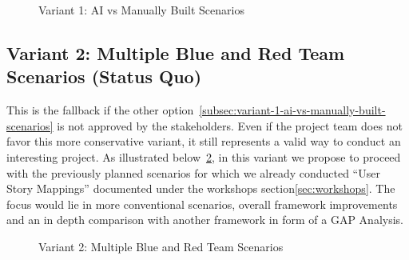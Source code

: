 \begin{figure}
    \centering
    
    \caption{Variant 1: AI vs Manually Built Scenarios}
    \label{fig:variant-1-ai-vs-manually-built-scenarios}
\end{figure}

\subsection{Variant 2: Multiple Blue and Red Team Scenarios (Status Quo)}\label{subsec:variant-2-multiple-blue-and-red-team-scenarios}

This is the fallback if the other option~\ref{subsec:variant-1-ai-vs-manually-built-scenarios} is not approved by the stakeholders.
Even if the project team does not favor this more conservative variant, it still represents a valid way to conduct an interesting project.
As illustrated below~\ref{fig:variant-2-multiple-blue-and-red-team-scenarios}, in this variant we propose to proceed with the previously planned scenarios for which we already conducted \enquote{User Story Mappings} documented under the workshops section\ref{sec:workshops}.
The focus would lie in more conventional scenarios, overall framework improvements and an in depth comparison with another framework in form of a GAP Analysis.

\begin{figure}
    \centering
    
    \caption{Variant 2: Multiple Blue and Red Team Scenarios}
    \label{fig:variant-2-multiple-blue-and-red-team-scenarios}
\end{figure}
